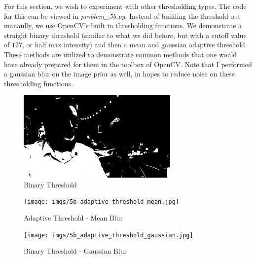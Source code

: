 \documentclass{article}
\begin{document}
For this section, we wish to experiment with other thresholding types. The code for this can be viewed in \textit{problem\_5b.py}. Instead of building the threshold out manaully, we use OpenCV's built in thresholding functions. We demonstrate a straight binary threshold (similar to what we did before, but with a cutoff value of $127$, or half max intensity) and then a mean and gaussian adaptive threshold. These methods are utilized to demonstrate common methods that one would have already prepared for them in the toolbox of OpenCV. Note that I performed a gaussian blur on the image prior as well, in hopes to reduce noise on these thresholding functions.

\begin{figure}[H]
    \centering
    \includegraphics[width = 0.7\textwidth]{imgs/5b_binary_threshold.jpg}
    \caption{Binary Threshold}
    \label{fig:problem5b1}
\end{figure}

\begin{figure}[H]
    \centering
    \texttt{[image: imgs/5b\_adaptive\_threshold\_mean.jpg]}
    \caption{Adaptive Threshold - Mean Blur}
    \label{fig:problem5b2}
\end{figure}

\begin{figure}[H]
    \centering
    \texttt{[image: imgs/5b\_adaptive\_threshold\_gaussian.jpg]}
    \caption{Binary Threshold - Gaussian Blur}
    \label{fig:problem5b3}
\end{figure}
\end{document}
